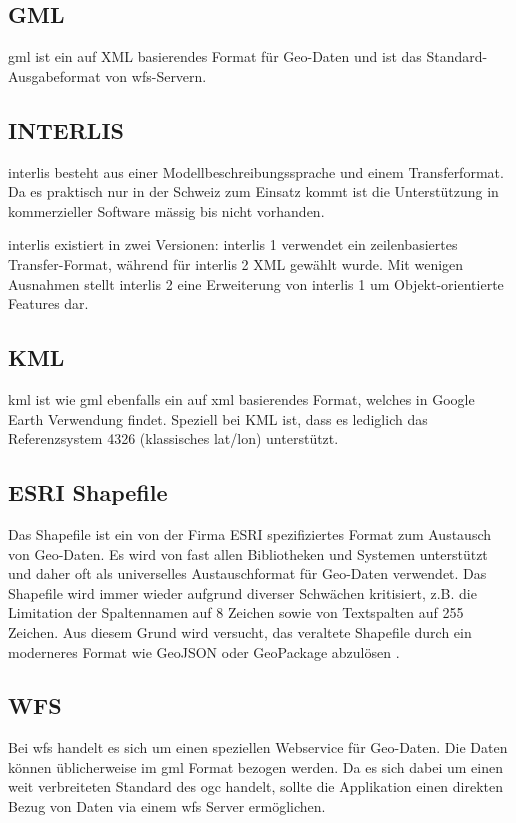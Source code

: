 \subsection{GML}
\gls{gml} ist ein auf XML basierendes Format für Geo-Daten und ist das Standard-Ausgabeformat von \acs{wfs}-Servern.


\subsection{INTERLIS}
\gls{interlis} besteht aus einer Modellbeschreibungssprache und einem Transferformat. Da es praktisch nur in der Schweiz zum Einsatz kommt ist die Unterstützung in kommerzieller Software mässig bis nicht vorhanden.

\gls{interlis} existiert in zwei Versionen: \gls{interlis} 1 verwendet ein zeilenbasiertes Transfer-Format, während für \gls{interlis} 2 XML gewählt wurde. Mit wenigen Ausnahmen stellt \gls{interlis} 2 eine Erweiterung von \gls{interlis} 1 um Objekt-orientierte Features dar.

\subsection{KML}
\gls{kml} ist wie \gls{gml} ebenfalls ein auf \acs{xml} basierendes Format, welches in Google Earth Verwendung findet. Speziell bei KML ist, dass es lediglich das Referenzsystem 4326 (klassisches lat/lon) unterstützt.


\subsection{ESRI Shapefile}
Das Shapefile ist ein von der Firma ESRI spezifiziertes Format zum Austausch von Geo-Daten. Es wird von fast allen Bibliotheken und Systemen unterstützt und daher oft als universelles Austauschformat für Geo-Daten verwendet. Das Shapefile wird immer wieder aufgrund diverser Schwächen kritisiert, z.B. die Limitation der Spaltennamen auf 8 Zeichen sowie von Textspalten auf 255 Zeichen. Aus diesem Grund wird versucht, das veraltete Shapefile durch ein moderneres Format wie GeoJSON oder GeoPackage abzulösen \cite{sfkeller}.

\subsection{WFS}
Bei \gls{wfs} handelt es sich um einen speziellen Webservice für Geo-Daten. Die Daten können üblicherweise im \gls{gml} Format bezogen werden. Da es sich dabei um einen weit verbreiteten Standard des \gls{ogc} handelt, sollte die Applikation einen direkten Bezug von Daten via einem \acs{wfs} Server ermöglichen.

